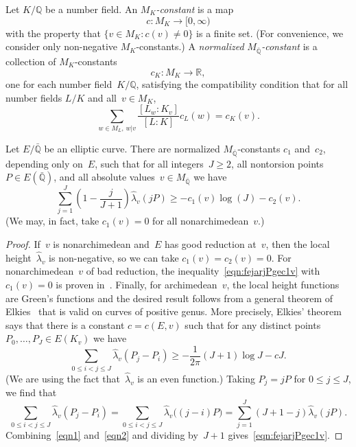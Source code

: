 \begin{definition}
Let $K/{\mathbb{Q}}$ be a number field. An \emph{$M_K$-constant} is a map
\[
  c : M_K\longrightarrow [0,\infty)
\]
with the property that $\{v\in M_K:c(v)\ne0\}$ is a finite set.  (For
convenience, we consider only non-negative $M_K$-constants.)  A
\emph{normalized} \emph{$M_{{\bar{\mathbb{Q}}}}$-constant} is a collection of
$M_K$-constants
\[
  c_K : M_K\longrightarrow{\mathbb{R}},
\]
one for each number field~$K/{\mathbb{Q}}$, satisfying the compatibility
condition that for all number fields $L/K$ and all~$v\in M_K$,
\[
  \sum_{w\in M_L,\, w|v} \frac{[L_w:K_v]}{[L:K]}c_L(w) = c_K(v).
\]
\end{definition}

\begin{proposition}
\label{prop:fourieravg}
Let $E/{{\bar{\mathbb{Q}}}}$ be an elliptic curve. There are normalized
$M_{{\bar{\mathbb{Q}}}}$-constants $c_1$ and~$c_2$, depending only on~$E$, such
that for all integers~$J\ge2$, all nontorsion points~$P\in E({{\bar{\mathbb{Q}}}})$,
and all absolute values~$v\in M_{{\bar{\mathbb{Q}}}}$ we have
\begin{equation}
  \label{eqn:fejarjPgec1v}
  \sum_{j=1}^J \left(1-\frac{j}{J+1}\right){\hat\lambda}_v(jP)
  \ge -c_1(v)\log(J)-c_2(v).
\end{equation}
\textup(We may, in fact, take $c_1(v)=0$  for all nonarchimedean~$v$.\textup)
\end{proposition}
\begin{proof}
If~$v$ is nonarchimedean and~$E$ has good reduction at~$v$, then the
local height~${\hat\lambda}_v$ is non-negative, so we can take
$c_1(v)=c_2(v)=0$.  For nonarchimedean~$v$ of bad reduction, the
inequality~\eqref{eqn:fejarjPgec1v} with $c_1(v)=0$ is proven
in~\cite{HiSi2}.  Finally, for archimedean~$v$, the local height
functions are Green's functions and the desired result follows from a
general theorem of Elkies~\cite[Theorem~5.1]{LangAT} that is valid on
curves of positive genus. More precisely, Elkies' theorem says that
there is a constant $c=c(E,v)$ such that for any distinct
points~$P_0,\ldots,P_J\in E(K_v)$ we have
\begin{equation}
  \label{eqn1}
  \sum_{0\le i<j\le J}
  {\hat\lambda}_v(P_j-P_i) \ge -\frac{1}{2\pi}(J+1)\log J - cJ.
\end{equation}
(We are using the fact that~${\hat\lambda}_v$ is an even function.)
Taking $P_j=jP$ for $0\le j\le J$, we find that
\begin{equation}
  \label{eqn2}
  \sum_{0\le i<j\le J} {\hat\lambda}_v(P_j-P_i)
  = \sum_{0\le i<j\le J} {\hat\lambda}_v\bigl((j-i)P\bigr)
  = \sum_{j=1}^J (J+1-j){\hat\lambda}_v(jP).
\end{equation}
Combining~\eqref{eqn1} and~\eqref{eqn2} and dividing by~$J+1$
gives~\eqref{eqn:fejarjPgec1v}.
\end{proof}

